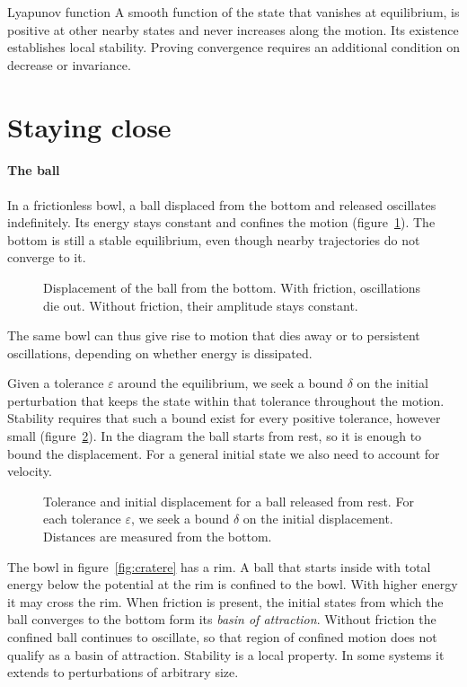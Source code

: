 \begin{parola}{Lyapunov function}
A smooth function of the state that vanishes at equilibrium, is positive at other nearby states and never increases along the motion. Its existence establishes local stability. Proving convergence requires an additional condition on decrease or invariance.
\end{parola}

\section{Staying close}\label{sec:vicini}

\paragraph{The ball} In a frictionless bowl, a ball displaced from the bottom and released oscillates indefinitely. Its energy stays constant and confines the motion (figure~\ref{fig:duegrafici}). The bottom is still a stable equilibrium, even though nearby trajectories do not converge to it.

\begin{figure}
\caption{Displacement of the ball from the bottom. With friction, oscillations die out. Without friction, their amplitude stays constant.}
\label{fig:duegrafici}
\end{figure}

The same bowl can thus give rise to motion that dies away or to persistent oscillations, depending on whether energy is dissipated.

Given a tolerance $\varepsilon$ around the equilibrium, we seek a bound $\delta$ on the initial perturbation that keeps the state within that tolerance throughout the motion. Stability requires that such a bound exist for every positive tolerance, however small (figure~\ref{fig:patto}). In the diagram the ball starts from rest, so it is enough to bound the displacement. For a general initial state we also need to account for velocity.

\begin{figure}
\caption{Tolerance and initial displacement for a ball released from rest. For each tolerance $\varepsilon$, we seek a bound $\delta$ on the initial displacement. Distances are measured from the bottom.}
\label{fig:patto}
\end{figure}

The bowl in figure~\ref{fig:cratere} has a rim. A ball that starts inside with total energy below the potential at the rim is confined to the bowl. With higher energy it may cross the rim. When friction is present, the initial states from which the ball converges to the bottom form its \emph{basin of attraction}. Without friction the confined ball continues to oscillate, so that region of confined motion does not qualify as a basin of attraction. Stability is a local property. In some systems it extends to perturbations of arbitrary size.

